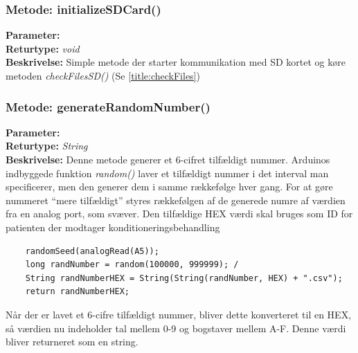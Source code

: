 \subsubsection{Metode: initializeSDCard()}
\textbf{Parameter: } 
\\ \textbf{Returtype: } \textit{void}
\\ \textbf{Beskrivelse: }  Simple metode der starter kommunikation med SD kortet og køre metoden\textit{ checkFilesSD()} (Se \ref{title:checkFiles})

\subsubsection{Metode: generateRandomNumber()} \label{title:RandomNumber}
\textbf{Parameter: } 
\\ \textbf{Returtype: } \textit{String}
\\ \textbf{Beskrivelse: }  Denne metode generer et 6-cifret tilfældigt nummer. Arduinos indbyggede funktion \textit{random()} laver et tilfældigt nummer i det interval man specificerer, men den generer dem i samme rækkefølge hver gang. For at gøre nummeret “mere tilfældigt” styres rækkefølgen af de generede numre af værdien fra en analog port, som svæver. Den tilfældige HEX værdi skal bruges som ID for patienten der modtager konditioneringsbehandling 
\begin{lstlisting}
	randomSeed(analogRead(A5)); 
	long randNumber = random(100000, 999999); /
	String randNumberHEX = String(String(randNumber, HEX) +	".csv");
	return randNumberHEX; 
\end{lstlisting}
Når der er lavet et 6-cifre tilfældigt nummer, bliver dette konverteret til en HEX, så værdien nu indeholder tal mellem 0-9 og bogstaver mellem A-F. Denne værdi bliver returneret som en string. 

